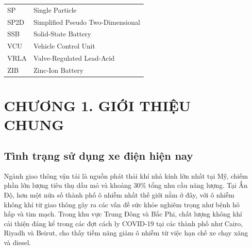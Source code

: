 \documentclass{thesis}
\begin{document}
\begin{tabular}{ l l }
    \hspace{1cm} SP & \hspace{4cm} Single Particle \\
    \hspace{1cm} SP2D & \hspace{4cm} Simplified Pseudo Two-Dimensional \\
    \hspace{1cm} SSB & \hspace{4cm} Solid-State Battery \\
    \hspace{1cm} VCU & \hspace{4cm} Vehicle Control Unit \\
    \hspace{1cm} VRLA & \hspace{4cm} Valve-Regulated Lead-Acid \\
    \hspace{1cm} ZIB & \hspace{4cm} Zinc-Ion Battery \\
\end{tabular}
\newpage
    \newpage
    {\let\oldnumberline\numberline
    \renewcommand{\numberline}{Hình~\oldnumberline}
    \listoffigures}
    \newpage

    {\let\oldnumberline\numberline
    \renewcommand{\numberline}{Bảng~\oldnumberline}
    \listoftables}
    \newpage

    \section*{CHƯƠNG 1. GIỚI THIỆU CHUNG}
    \setcounter{section}{1}
    \setcounter{subsection}{0}
    \setcounter{figure}{0}
    \setcounter{table}{0}

    \subsection{Tình trạng sử dụng xe điện hiện nay}
    Ngành giao thông vận tải là nguồn phát thải khí nhà kính lớn nhất tại Mỹ, chiếm phần lớn lượng tiêu thụ dầu mỏ và khoảng 30\% tổng nhu cầu năng lượng. Tại Ấn Độ, hơn một nửa số thành phố ô nhiễm nhất thế giới nằm ở đây, với ô nhiễm không khí từ giao thông gây ra các vấn đề sức khỏe nghiêm trọng như bệnh hô hấp và tim mạch. Trong khu vực Trung Đông và Bắc Phi, chất lượng không khí cải thiện đáng kể trong các đợt cách ly COVID-19 tại các thành phố như Cairo, Riyadh và Beirut, cho thấy tiềm năng giảm ô nhiễm từ việc hạn chế xe chạy xăng và diesel. \cite{worldbank}
\end{document}

